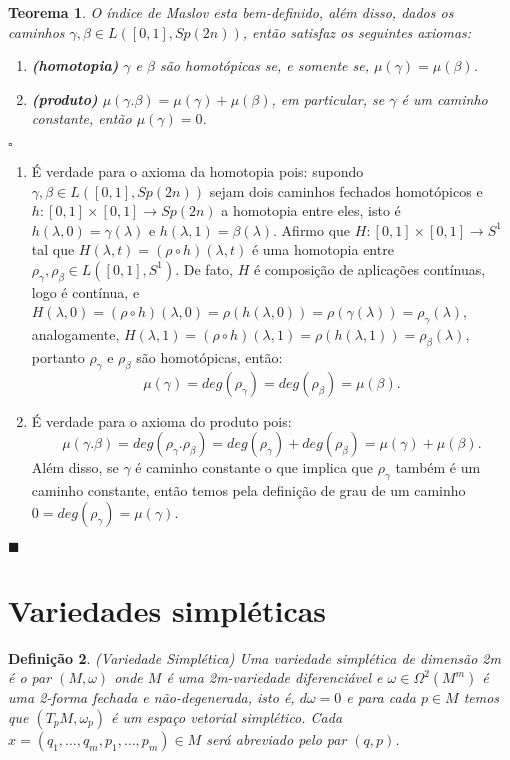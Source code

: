 \documentclass[12pt]{book}
\newtheorem{teorema}{Teorema}[section]
\newtheorem{definicao}[teorema]{Definição}
\newenvironment{prova}[1]{$\square$ #1}{\hfill$\blacksquare$}
\newcommand{\gruposimpletico}[1]{Sp(#1)}
\newcommand{\caminhosfechadoscirculo}[2]{L([#1,#2], S^{1})}
\newcommand{\caminhosfechadosSp}[2]{L([#1,#2], \gruposimpletico{2n})}
\begin{document}
	\begin{teorema}\label{teorema_indice_maslov}
		O índice de Maslov esta bem-definido, além disso, dados os caminhos $\gamma, \beta \in \caminhosfechadosSp{0}{1}$, então satisfaz os seguintes axiomas:
		\begin{enumerate}
			\item \textbf{(homotopia)} $\gamma$ e $\beta$ são homotópicas se, e somente se, $\mu(\gamma)=\mu(\beta)$.
			
			\item \textbf{(produto)} $\mu(\gamma.\beta) = \mu(\gamma)+\mu(\beta)$, em particular, se $\gamma$ é um caminho constante, então $\mu(\gamma) = 0$.
		\end{enumerate}
	\end{teorema}
	\begin{prova}
		\begin{enumerate}
			\item É verdade para o axioma da homotopia pois: supondo $\gamma, \beta \in \caminhosfechadosSp{0}{1}$ sejam dois caminhos fechados homotópicos e $h:[0,1]\times [0,1]\to \gruposimpletico{2n}$ a homotopia entre eles, isto é $h(\lambda, 0) = \gamma(\lambda)$ e $h(\lambda, 1) = \beta(\lambda)$. Afirmo que $H:[0,1] \times [0,1] \to S^{1}$ tal que $H(\lambda, t) = (\rho \circ h)(\lambda,t)$ é uma homotopia entre $\rho_{\gamma}, \rho_{\beta} \in \caminhosfechadoscirculo{0}{1}$. De fato, $H$ é composição de aplicações contínuas, logo é contínua, e $H(\lambda, 0) = (\rho \circ h)(\lambda,0) = \rho (h(\lambda,0))= \rho (\gamma(\lambda)) = \rho_{\gamma}(\lambda)$, analogamente, $H(\lambda, 1) = (\rho \circ h)(\lambda, 1) = \rho (h(\lambda,1))= \rho_{\beta}(\lambda)$, portanto $\rho_{\gamma}$ e $\rho_{\beta}$ são homotópicas, então:
			$$
			\mu(\gamma) = deg(\rho_{\gamma}) = deg(\rho_{\beta}) = \mu(\beta).
			$$
			\item É verdade para o axioma do produto pois:
			$$
			\mu(\gamma.\beta) = deg(\rho_{\gamma}.\rho_{\beta}) = deg(\rho_{\gamma})+deg(\rho_{\beta}) = \mu(\gamma)+\mu(\beta).
			$$	
			Além disso, se $\gamma$ é caminho constante o que implica que $\rho_{\gamma}$ também é um caminho constante, então temos pela definição de grau de um caminho $0=deg(\rho_{\gamma}) = \mu(\gamma)$.
		\end{enumerate}
	\end{prova}
		
	\section{Variedades simpléticas}
	\begin{definicao}
		(Variedade Simplética) Uma variedade simplética de dimensão 2m é o par $(M, \omega)$ onde $M$ é uma 2m-variedade diferenciável e $\omega \in \Omega^{2}(M^{m})$ é uma 2-forma fechada e não-degenerada, isto é, $d\omega = 0$ e para cada $p \in M$ temos que $(T_{p}M, \omega_{p})$ é um espaço vetorial simplético. Cada $x = (q_{1}, \dots, q_{m}, p_{1}, \dots, p_{m}) \in M$  será abreviado pelo par $(q,p)$.
	\end{definicao}
	
\end{document}
